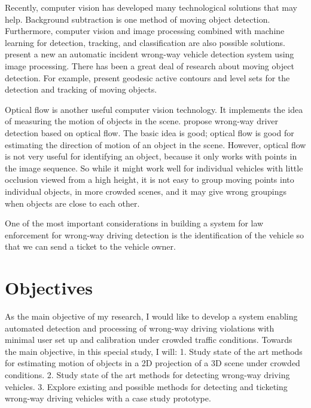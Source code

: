 Recently, computer vision has developed many technological solutions that may help. Background subtraction \cite{piccardi2004background} is one method of moving object detection. Furthermore, computer vision and image processing combined with machine learning for detection, tracking, and classification are also possible solutions.  present a new an automatic incident wrong-way vehicle detection system using image processing. There has been a great deal of research about moving object detection. For example,  present geodesic active contours and level sets for the detection and tracking of moving objects.
 
Optical flow \cite{horn1981determining} is another useful computer vision technology. It implements the idea of measuring the motion of objects in the scene.  propose wrong-way driver detection based on optical flow. The basic idea is good; optical flow is good for estimating the direction of motion of an object in the scene. However, optical flow is not very useful for identifying an object, because it only works with points in the image sequence. So while it might work well for individual vehicles with little occlusion viewed from a high height, it is not easy to group moving points into individual objects, in more crowded scenes, and it may give wrong groupings when objects are close to each other.
 
One of the most important considerations in building a system for law enforcement for wrong-way driving detection is the identification of the vehicle so that we can send a ticket to the vehicle owner.\newline

\section{Objectives}
As the main objective of my research, I would like to develop a system enabling automated detection and processing of wrong-way driving violations with minimal user set up and calibration under crowded traffic conditions. Towards the main objective, in this special study, I will:\newline 
\tab \hspace{8mm}1. Study state of the art methods for estimating motion of objects in a 2D projection of a 3D scene under crowded conditions.\newline 
\tab \hspace{8mm}2. Study state of the art methods for detecting wrong-way driving vehicles.\newline 
\tab \hspace{8mm}3. Explore existing and possible methods for detecting and ticketing wrong-way driving vehicles with a case study prototype.
 
